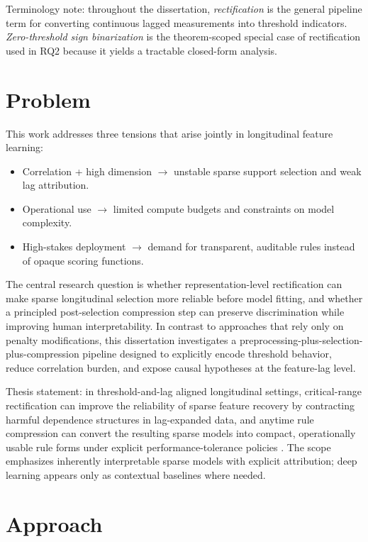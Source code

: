 Terminology note: throughout the dissertation, \emph{rectification} is the general pipeline term for converting continuous lagged measurements into threshold indicators. \emph{Zero-threshold sign binarization} is the theorem-scoped special case of rectification used in RQ2 because it yields a tractable closed-form analysis.

\section{Problem}
This work addresses three tensions that arise jointly in longitudinal feature learning:

\begin{itemize}
	\item Correlation + high dimension $\rightarrow$ unstable sparse support selection and weak lag attribution.
	\item Operational use $\rightarrow$ limited compute budgets and constraints on model complexity.
	\item High-stakes deployment $\rightarrow$ demand for transparent, auditable rules instead of opaque scoring functions.
\end{itemize}

The central research question is whether representation-level rectification can make sparse longitudinal selection more reliable before model fitting, and whether a principled post-selection compression step can preserve discrimination while improving human interpretability. In contrast to approaches that rely only on penalty modifications, this dissertation investigates a preprocessing-plus-selection-plus-compression pipeline designed to explicitly encode threshold behavior, reduce correlation burden, and expose causal hypotheses at the feature-lag level.

Thesis statement: in threshold-and-lag aligned longitudinal settings, critical-range rectification can improve the reliability of sparse feature recovery by contracting harmful dependence structures in lag-expanded data, and anytime rule compression can convert the resulting sparse models into compact, operationally usable rule forms under explicit performance-tolerance policies \autocites{JOrender2025Efficient,JOrender2025Anytime}. The scope emphasizes inherently interpretable sparse models with explicit attribution; deep learning appears only as contextual baselines where needed.

\section{Approach}

